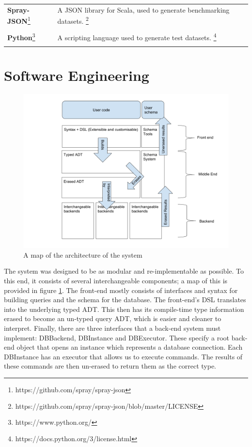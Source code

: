 \documentclass[12pt,a4paper,twoside,openright]{report}
\begin{document}
\begin{tabular}{p{4cm}p{11cm}}
\textbf{Spray-JSON}\footnote{https://github.com/spray/spray-json}& A JSON library for Scala, used to generate benchmarking datasets. \footnote{https://github.com/spray/spray-json/blob/master/LICENSE} \\\\

\textbf{Python}\footnote{https://www.python.org/} & A scripting language used to generate test datasets. \footnote{https://docs.python.org/3/license.html}
\\\\

\end{tabular}


\section{Software Engineering}

\begin{figure}[ht]
\centering
  \includegraphics[width=\textwidth]{figs/Architecture.png}
  \caption{A map of the architecture of the system}
  \label{fig:Architecture}
\end{figure}
The system was designed to be as modular and re-implementable as possible. To this end, it consists of several interchangeable components; a map of this is provided in figure \ref{fig:Architecture}. The front-end mostly consists of interfaces and syntax for building queries and the schema for the database. The front-end's DSL translates into the underlying typed ADT. This then has its compile-time type information erased to become an un-typed query ADT, which is easier and cleaner to interpret. Finally, there are three interfaces that a back-end system must implement: DBBackend, DBInstance and DBExecutor. These specify a root back-end object that opens an instance which represents a database connection. Each DBInstance has an executor that allows us to execute commands. The results of these commands are then un-erased to return them as the correct type.
\end{document}
